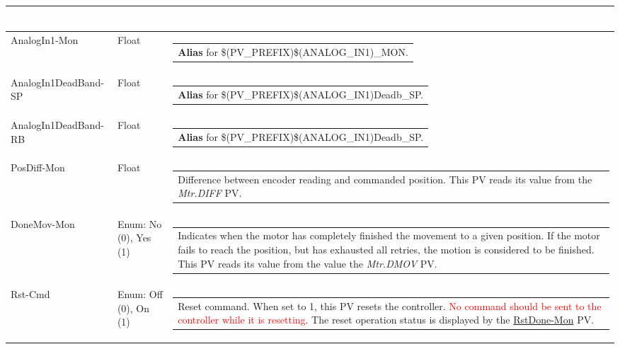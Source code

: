 \documentclass[openany]{article}
\begin{document}
\begin{longtable}{| m{4.5cm} m{2.5cm}  m{8.5cm} |}
\begin{tabular}{@{}m{6cm}@{}}
            \end{tabular} \hypertarget{pv:analog-in-1-mon}{}\\ \hline
        AnalogIn1-Mon & Float & \begin{tabular}{@{}m{6cm}@{}}
                \textbf{\color{blue} Alias} for \$(PV\_PREFIX)\$(ANALOG\_IN1)\_MON.
            \end{tabular} \hypertarget{pv:analog-in-1-dead-band}{}\\ \hline
        AnalogIn1DeadBand-SP & Float & \begin{tabular}{@{}m{6cm}@{}}
                \textbf{\color{blue} Alias} for \$(PV\_PREFIX)\$(ANALOG\_IN1)Deadb\_SP.
            \end{tabular} \hypertarget{}{}\\ \hline
        AnalogIn1DeadBand-RB & Float & \begin{tabular}{@{}m{6cm}@{}}
                \textbf{\color{blue} Alias} for \$(PV\_PREFIX)\$(ANALOG\_IN1)Deadb\_SP.
            \end{tabular} \hypertarget{pv:pos-diff-mon}{}\\ \hline
        PosDiff-Mon & Float & \begin{tabular}{@{}m{6cm}@{}}
                Difference between encoder reading and commanded position. This PV reads its value from the \emph{Mtr.DIFF} PV.
            \end{tabular} \hypertarget{pv:done-mov-mon}{}\\ \hline
        DoneMov-Mon & Enum: No (0), Yes (1) & \begin{tabular}{@{}m{6cm}@{}}
                Indicates when the motor has completely finished the movement to a given position. If the motor fails to reach the position, but has exhausted all retries, the motion is considered to be finished. This PV reads its value from the value the \emph{Mtr.DMOV} PV.
            \end{tabular} \hypertarget{pv:rst-cmd}{}\\ \hline
        Rst-Cmd & Enum: Off (0), On (1) & \begin{tabular}{@{}m{6cm}@{}}
                Reset command. When set to 1, this PV resets the controller. \textcolor{red}{No command should be sent to the controller while it is resetting}. The reset operation status is displayed by the \hyperlink{pv:rst-done-mon}{RstDone-Mon} PV.
            \end{tabular} \hypertarget{pv:rst-done-mon}{}\\ \hline

\end{longtable}
\end{document}
